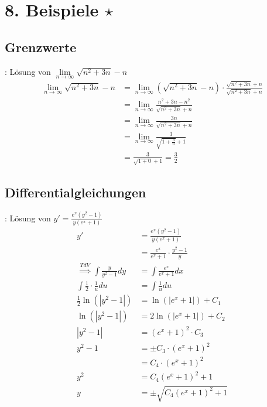 \section{8. Beispiele \texorpdfstring{$\star$}{*}}

\subsection{Grenzwerte}
\Bsp {}: Lösung von $\lim\limits_{n\to\infty} \sqrt{n^2 + 3n} - n$
\begin{align*}
    \lim\limits_{n\to\infty} \sqrt{n^2 + 3n} - n &=\lim\limits_{n\to\infty} (\sqrt{n^2 + 3n} - n) \cdot \frac{\sqrt{n^2 + 3n} + n}{\sqrt{n^2 + 3n} + n} \\[-0.6em]
        &= \lim\limits_{n\to\infty} \frac{n^2 + 3n - n^2}{\sqrt{n^2 + 3n} + n} \\[-0.2em]
        &= \lim\limits_{n\to\infty} \frac{3n}{\sqrt{n^2 + 3n} + n} \\[-.3em]
        &= \lim\limits_{n\to\infty} \frac{3}{\sqrt{1 + \frac{3}{n}} + 1} \\[-.3em]
        &= \frac{3}{\sqrt{1 + 0} + 1} = \frac{3}{2}
\end{align*}

\subsection{Differentialgleichungen}

\Bsp {}: Lösung von $y' = \frac{e^x(y^2 - 1)}{y(e^x + 1)}$
\vspace{-0.2em}
\begin{align*}
    y' &= \frac{e^x(y^2 - 1)}{y(e^x + 1)} \\[-0.4em]
       &= \frac{e^x}{e^x + 1} \cdot \frac{y^2 - 1}{y} \\[-0.4em]
    \overset{TdV}{\implies} \int \frac{y}{y^2 - 1}dy &= \int \frac{e^x}{e^x + 1}dx \\[-0.3em]
    \int \frac{1}{2} \cdot \frac{1}{u} du &= \int \frac{1}{u} du \\[-0.5em]
    \frac{1}{2}\ln(|y^2 - 1|) &= \ln(|e^x + 1|) + C_1 \\[-0.6em]
    \ln(|y^2 - 1|) &= 2\ln(|e^x + 1|) + C_2 \\[-0.6em]
    |y^2 - 1| &= (e^x + 1)^2 \cdot C_3 \\[-0.6em]
    y^2 - 1 &= \pm C_3 \cdot (e^x + 1)^2 \\[-0.6em]
            &= C_4 \cdot (e^x + 1)^2 \\[-0.6em]
    y^2 &= C_4 (e^x + 1)^2 + 1 \\[-0.6em]
    y &= \pm \sqrt{C_4 (e^x + 1)^2 + 1}
\end{align*}

